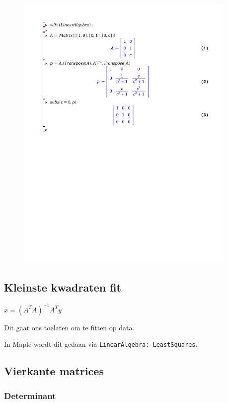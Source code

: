 \documentclass[a4paper]{article}
\begin{document}
\begin{figure}
	\begin{center}
		\includegraphics[width=0.95\textwidth]{./projector.pdf}
	\end{center}
	\caption{}\label{fig:projectie}
\end{figure}

\subsection{Kleinste kwadraten fit}

$x = (A^T A)^{-1} A^T y$

Dit gaat ons toelaten om te fitten op data.

In Maple wordt dit gedaan via \texttt{LinearAlgebra:-LeastSquares}.

\subsection{Vierkante matrices}

\subsubsection{Determinant}
\end{document}

